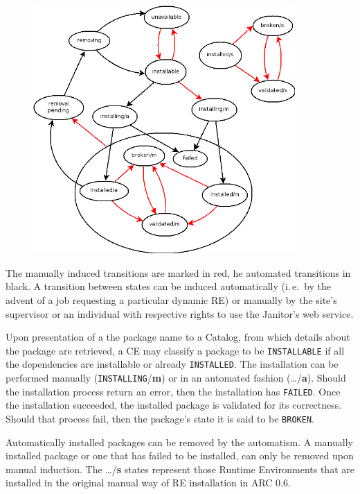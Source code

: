 \begin{figure}[!h]
  \begin{center}
    \includegraphics[width=10cm]{images/RE_states.png}
    \label{fig:RE_states}
  \end{center}
\end{figure}
 
The manually induced transitions are marked in red, he automated transitions in black.
A transition between states can be induced automatically (i.\,e.\ by the
advent of a job requesting a particular dynamic RE) or manually by the
site's supervisor or an individual with respective rights to use the
Janitor's web service.

Upon presentation of a the package name to a Catalog, from which details about
the package are retrieved, a CE may
classify a package to be \texttt{INSTALLABLE} if all the dependencies
are installable or already \texttt{INSTALLED}. The installation can be
performed manually (\texttt{INSTALLING}/{\bf m}) or in an automated fashion
(\ldots/{\bf a}). Should the installation process return an error, then
the installation has \texttt{FAILED}. Once the installation succeeded,
the installed package is validated for its correctness. Should that
process fail, then the package's state it is said to be \texttt{BROKEN}.

Automatically installed packages can be removed by the automatism. A
manually installed package or one that has failed to be installed,
can only be removed upon manual induction.  The \ldots/{\bf s} states
represent those Runtime Environments that are installed in the original
manual way of RE installation in ARC 0.6.

